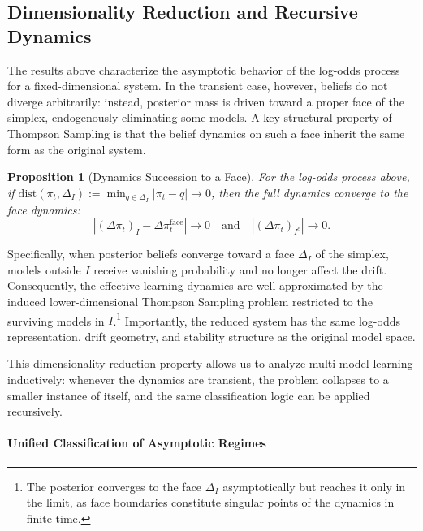 \documentclass[12pt]{article}
\newtheorem{proposition}{Proposition}
\begin{document}
\subsection{Dimensionality Reduction and Recursive Dynamics}

The results above characterize the asymptotic behavior of the log-odds process for a fixed-dimensional system.
In the transient case, however, beliefs do not diverge arbitrarily: instead, posterior mass is driven toward a proper face of the simplex, endogenously eliminating some models.
A key structural property of Thompson Sampling is that the belief dynamics on such a face inherit the same form as the original system.

\begin{proposition}[Dynamics Succession to a Face]
\label{prop:dynamics_succession}
For the log-odds process above, if \(\mathrm{dist}(\pi_t,\Delta_I):=\min_{q\in\Delta_I}|\pi_t-q|\to 0\), then the full dynamics converge to the face dynamics:
\begin{equation}
|( \Delta\pi_t )_{I}-\Delta\pi^{\text{face}}_t| \longrightarrow 0 \quad \text{and}\quad |( \Delta\pi_t )_{I^c}| \longrightarrow 0.
\end{equation}

\end{proposition}

Specifically, when posterior beliefs converge toward a face $\Delta_I$ of the simplex, models outside $I$ receive vanishing probability and no longer affect the drift.
Consequently, the effective learning dynamics are well-approximated by the induced lower-dimensional Thompson Sampling problem restricted to the surviving models in $I$.\footnote{The posterior converges to the face $\Delta_I$ asymptotically but reaches it only in the limit, as face boundaries constitute singular points of the dynamics in finite time.}
Importantly, the reduced system has the same log-odds representation, drift geometry, and stability structure as the original model space.

This dimensionality reduction property allows us to analyze multi-model learning inductively: whenever the dynamics are transient, the problem collapses to a smaller instance of itself, and the same classification logic can be applied recursively.


\paragraph{Unified Classification of Asymptotic Regimes}
\end{document}
